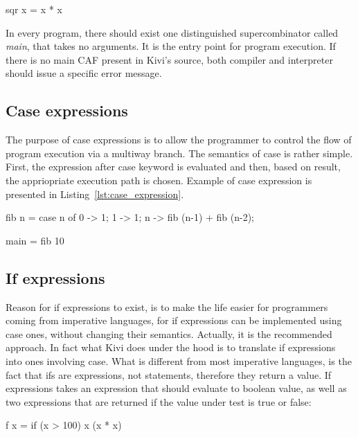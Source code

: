 \documentclass[12pt,a4paper]{report}
\begin{document}
\vspace*{0.2in}
\begin{code}[style=haskell,label=supercombinator_ex,caption={Simple supercombinator.}]
sqr x = x * x
\end{code}

In every program, there should exist one distinguished supercombinator called
\textit{main}, that takes no arguments. It is the entry point for program
execution. If there is no main CAF present in Kivi's source, both compiler and
interpreter should issue a specific error message.

\subsection{Case expressions}
The purpose of case expressions is to allow the programmer to control the flow
of program execution via a multiway branch. The semantics of case is rather
simple. First, the expression after case keyword is evaluated and then, based
on result, the appriopriate execution path is chosen. Example of case
expression is presented in Listing~\ref{lst:case_expression}.

\vspace*{0.2in}
\begin{code}[style=haskell,label=lst:case_expression,caption={Fibonacci with case}]
fib n =
    case n of
        0 -> 1;
        1 -> 1;
        n -> fib (n-1) + fib (n-2);

main = fib 10
\end{code}

\subsection{If expressions}
Reason for if expressions to exist, is to make the life easier for programmers
coming from imperative languages, for if expressions can be implemented using
case ones, without changing their semantics. Actually, it is the recommended
approach. In fact what Kivi does under the hood is to translate if expressions
into ones involving case.  What is different from most imperative languages, is
the fact that ifs are expressions, not statements, therefore they return a
value. If expressions takes an expression that should evaluate to boolean
value, as well as two expressions that are returned if the value under test is
true or false:

\vspace*{0.2in}
\begin{code}[style=haskell,label=lst:if_expression,caption={Fibonacci with case}]
f x = if (x > 100) x (x * x)
\end{code}
\end{document}
